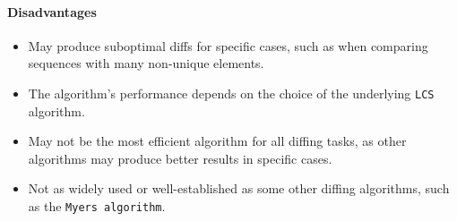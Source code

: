 \paragraph{Disadvantages}
\begin{itemize}
    \item May produce suboptimal diffs for specific cases, such as when comparing sequences with many non-unique elements.
    \item The algorithm's performance depends on the choice of the underlying \lstinline{LCS} algorithm.
    \item May not be the most efficient algorithm for all diffing tasks, as other algorithms may produce better results in specific cases.
    \item Not as widely used or well-established as some other diffing algorithms, such as the \lstinline{Myers algorithm}.
\end{itemize}

